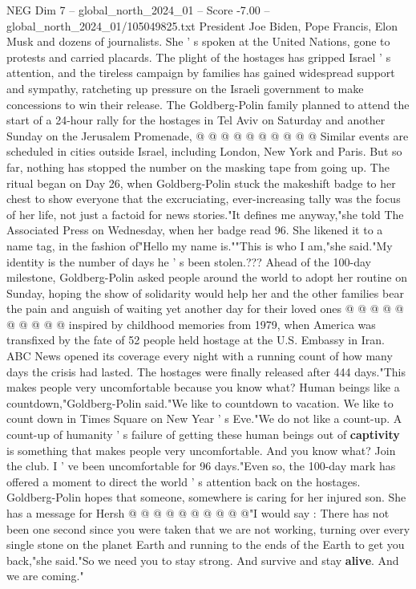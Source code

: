 \begin{textsample}{NEG Dim 7 – global\_north\_2024\_01 – Score -7.00 – global\_north\_2024\_01/105049825.txt}
President Joe Biden, Pope Francis, Elon Musk and dozens of journalists.
She ' s spoken at the United Nations, gone to protests and carried placards.
The plight of the hostages has gripped Israel ' s attention, and the tireless campaign by families has gained widespread support and sympathy, ratcheting up pressure on the Israeli government to make concessions to win their release.
The Goldberg-Polin family planned to attend the start of a 24-hour rally for the hostages in Tel Aviv on Saturday and another Sunday on the Jerusalem Promenade, @ @ @ @ @ @ @ @ @ @ Similar events are scheduled in cities outside Israel, including London, New York and Paris.
But so far, nothing has stopped the number on the masking tape from going up.
The ritual began on Day 26, when Goldberg-Polin stuck the makeshift badge to her chest to show everyone that the excruciating, ever-increasing tally was the focus of her life, not just a factoid for news stories."It defines me anyway,"she told The Associated Press on Wednesday, when her badge read 96.
She likened it to a name tag, in the fashion of"Hello my name is.""This is who I am,"she said."My identity is the number of days he ' s been stolen.???
Ahead of the 100-day milestone, Goldberg-Polin asked people around the world to adopt her routine on Sunday, hoping the show of solidarity would help her and the other families bear the pain and anguish of waiting yet another day for their loved ones @ @ @ @ @ @ @ @ @ @ inspired by childhood memories from 1979, when America was transfixed by the fate of 52 people held hostage at the U.S.
Embassy in Iran.
ABC News opened its coverage every night with a running count of how many days the crisis had lasted.
The hostages were finally released after 444 days."This makes people very uncomfortable because you know what?
Human beings like a countdown,"Goldberg-Polin said."We like to countdown to vacation.
We like to count down in Times Square on New Year ' s Eve."We do not like a count-up.
A count-up of humanity ' s failure of getting these human beings out of \textbf{captivity} is something that makes people very uncomfortable.
And you know what?
Join the club.
I ' ve been uncomfortable for 96 days."Even so, the 100-day mark has offered a moment to direct the world ' s attention back on the hostages.
Goldberg-Polin hopes that someone, somewhere is caring for her injured son.
She has a message for Hersh @ @ @ @ @ @ @ @ @ @"I would say : There has not been one second since you were taken that we are not working, turning over every single stone on the planet Earth and running to the ends of the Earth to get you back,"she said."So we need you to stay strong.
And survive and stay \textbf{alive}.
And we are coming."

\end{textsample}
